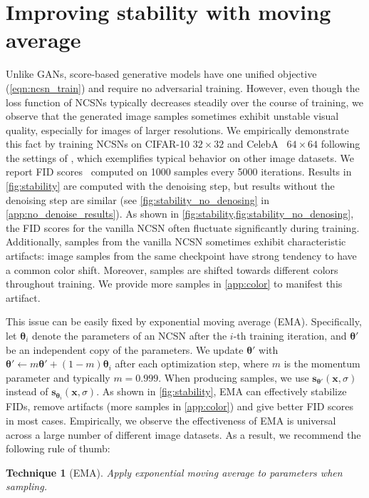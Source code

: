 \documentclass{article}
\newtheorem{recipe}{Technique}
\newcommand{\bfx}{\mathbf{x}}
\newcommand{\bftheta}{{\boldsymbol{\theta}}}
\newcommand{\bfs}{\mathbf{s}}
\begin{document}
 \section{Improving stability with moving average}\label{sec:stability}


Unlike GANs, score-based generative models have one unified objective (\cref{eqn:ncsn_train}) and require no adversarial training.
However, even though the loss function of NCSNs typically decreases steadily over the course of training, we observe that the generated image samples sometimes exhibit unstable visual quality, especially for images of larger resolutions. We empirically demonstrate this fact by training NCSNs on CIFAR-10 $32\times 32$ and CelebA~\cite{liu2015faceattributes} $64\times 64$ following the settings of \cite{song2019generative}, which exemplifies typical behavior on other image datasets. We report FID scores~\cite{heusel2017gans} computed on 1000 samples every 5000 iterations. Results in \cref{fig:stability} are computed with the denoising step, but results without the denoising step are similar (see \cref{fig:stability_no_denosing} in \cref{app:no_denoise_results}). As shown in \cref{fig:stability,fig:stability_no_denosing}, the FID scores for the vanilla NCSN often fluctuate significantly during training. Additionally, samples from the vanilla NCSN sometimes exhibit characteristic artifacts: image samples from the same checkpoint have strong tendency to have a common color shift. Moreover, samples are shifted towards different colors throughout training. We provide more samples in \cref{app:color} to manifest this artifact.



This issue can be easily fixed by exponential moving average (EMA). Specifically, let $\bftheta_i$ denote the parameters of an NCSN after the $i$-th training iteration, and $\bftheta'$ be an independent copy of the parameters. We update $\bftheta'$ with $\bftheta' \gets m \bftheta' + (1 - m) \bftheta_i$ after each optimization step, where $m$ is the momentum parameter and typically $m=0.999$. When producing samples, we use $\bfs_{\bftheta'}(\bfx, \sigma)$ instead of $\bfs_{\bftheta_i}(\bfx, \sigma)$. As shown in \cref{fig:stability}, EMA can effectively stabilize FIDs, remove artifacts (more samples in \cref{app:color}) and give better FID scores in most cases. Empirically, we observe the effectiveness of EMA is universal across a large number of different image datasets. As a result, we recommend the following rule of thumb:
\begin{recipe}[EMA]\label{rec:ema}
Apply exponential moving average to parameters when sampling.
\end{recipe}
\end{document}
